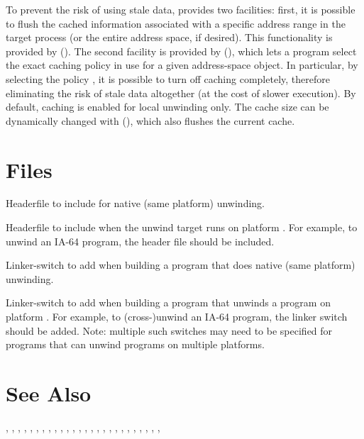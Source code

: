 \documentclass{article}
\begin{document}
To prevent the risk of using stale data,  provides two
facilities: first, it is possible to flush the cached information
associated with a specific address range in the target process (or the
entire address space, if desired).  This functionality is provided by
().  The second facility is provided by
(), which lets a program
select the exact caching policy in use for a given address-space
object.  In particular, by selecting the policy
, it is possible to turn off caching
completely, therefore eliminating the risk of stale data altogether
(at the cost of slower execution).  By default, caching is enabled for
local unwinding only.  The cache size can be dynamically changed with
(), which also flushes the current cache.


\section{Files}

\begin{Description}
\item[\File{libunwind.h}] Headerfile to include for native (same
  platform) unwinding.
\item[\File{libunwind-}\Var{PLAT}\File{.h}] Headerfile to include when
  the unwind target runs on platform .  For example, to unwind
  an IA-64 program, the header file  should be
  included.
\item[\Opt{-l}\File{unwind}] Linker-switch to add when building a
  program that does native (same platform) unwinding.
\item[\Opt{-l}\File{unwind-}\Var{PLAT}] Linker-switch to add when
  building a program that unwinds a program on platform .
  For example, to (cross-)unwind an IA-64 program, the linker switch
   should be added.  Note: multiple such switches
  may need to be specified for programs that can unwind programs on
  multiple platforms.
\end{Description}

\section{See Also}

,
,
,
,
,
,
,
,
,
,
,
,
,
,
,
,
,
,
,
,
,
,
,
,
,
,
\end{document}
